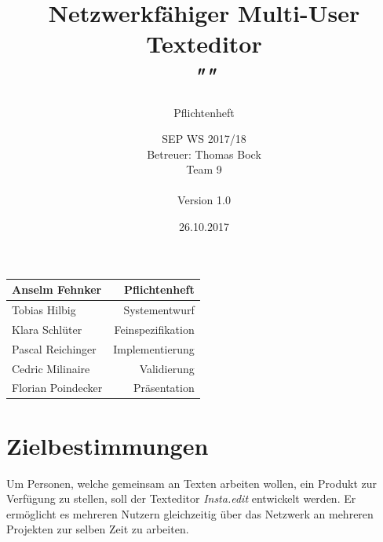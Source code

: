 \documentclass{scrartcl}
\title{Netzwerkfähiger Multi-User Texteditor\\
\textit{"\name"}}
\subtitle{Pflichtenheft}
\author{SEP WS 2017/18\\
Betreuer: Thomas Bock\\
Team 9\\ \\
Version 1.0}
\date{26.10.2017}
\newcommand{\name}{Insta.edit}
\begin{document}
\maketitle


\vfill

\begin{center}
  \begin{tabular}{ | l | r | }
    \hline
    Anselm Fehnker & Pflichtenheft \\ \hline
    Tobias Hilbig & Systementwurf \\ \hline
    Klara Schlüter & Feinspezifikation \\ \hline
    Pascal Reichinger & Implementierung \\ \hline
    Cedric Milinaire & Validierung \\ \hline
    Florian Poindecker & Präsentation  \\ \hline
  \end{tabular}
\end{center}

\thispagestyle{empty}
\pagebreak
\renewcommand{\contentsname}{Inhaltsverzeichnis}
\tableofcontents
\newpage

\section{Zielbestimmungen}
\label{zielbestimmungen}

Um Personen, welche gemeinsam an Texten arbeiten wollen, ein Produkt zur Verfügung zu stellen, soll der Texteditor \textit{\name} entwickelt werden. Er ermöglicht es mehreren Nutzern gleichzeitig über das Netzwerk an mehreren Projekten zur selben Zeit zu arbeiten.
\end{document}
